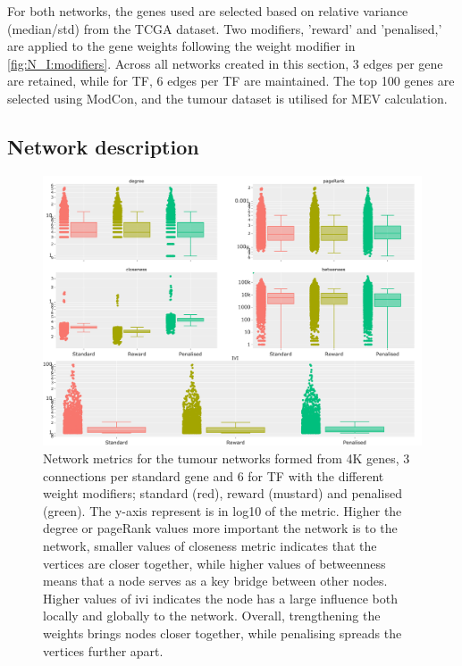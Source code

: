 For both networks, the genes used are selected based on relative variance (median/std) from the TCGA dataset. Two modifiers, 'reward' and 'penalised,' are applied to the gene weights following the weight modifier in \cref{fig:N_I:modifiers}. Across all networks created in this section, 3 edges per gene are retained, while for TF, 6 edges per TF are maintained. The top 100 genes are selected using ModCon, and the tumour dataset is utilised for MEV calculation.


\subsection{Network description} \label{s:N_I:tum_describe}

\begin{figure}[!t]  
\centering
\includegraphics[width=1.0\textwidth,keepaspectratio]{Sections/Network_I/Resources/Tum_network/NetworkMetricsComp_6TF.png}
    \caption[Tum: centrality network metrics]{Network metrics for the tumour networks formed from 4K genes, 3 connections per standard gene and 6 for TF with the different weight modifiers; standard (red), reward (mustard) and penalised (green). The y-axis represent is in log10 of the metric. Higher the degree or pageRank values more important the network is to the network, smaller values of closeness metric indicates that the vertices are closer together, while higher values of betweenness means that a node serves as a key bridge between other nodes. Higher values of \acrlong{ivi} indicates the node has a large influence both locally and globally to the network. Overall, trengthening the weights brings nodes closer together, while penalising spreads the vertices further apart.  }
    \label{fig:N_I:net_metrics_tum}
\end{figure}

